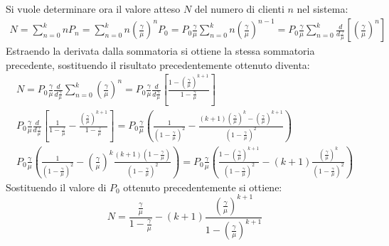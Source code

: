 \documentclass{article}
\numberwithin{equation}{subsection}
\begin{document}
Si vuole determinare ora il valore atteso $N$ del numero di clienti $n$ nel sistema:
\begin{gather*}
    N=\displaystyle\sum_{n=0}^knP_n=\sum_{n=0}^kn\left(\frac{\gamma}{\mu}\right)^nP_0=P_0\frac{\gamma}{\mu}\sum_{n=0}^kn\left(\frac{\gamma}{\mu}\right)^{n-1}=P_0\frac{\gamma}{\mu}\sum_{n=0}^k\frac{d}{d\displaystyle\frac{\gamma}{\mu}}\left[\left(\frac{\gamma}{\mu}\right)^n\right]
\end{gather*}
Estraendo la derivata dalla sommatoria si ottiene la stessa sommatoria precedente, sostituendo il risultato precedentemente ottenuto diventa: 
\begin{gather*}
    N=P_0\displaystyle\frac{\gamma}{\mu}\frac{d}{\displaystyle d\frac{\gamma}{\mu}}\sum_{n=0}^k\left(\frac{\gamma}{\mu}\right)^n=P_0\frac{\gamma}{\mu}\frac{d}{\displaystyle d\frac{\gamma}{\mu}}\left[\frac{1-\displaystyle\left(\frac{\gamma}{\mu}\right)^{k+1}}{1-\displaystyle\frac{\gamma}{\mu}}\right]\\
    \displaystyle P_0\frac{\gamma}{\mu}\frac{d}{\displaystyle d\frac{\gamma}{\mu}}\left[\frac{1}{1-\displaystyle\frac{\gamma}{\mu}}-\frac{\displaystyle\left(\frac{\gamma}{\mu}\right)^{k+1}}{1-\displaystyle\frac{\gamma}{\mu}}\right]=P_0\frac{\gamma}{\mu}\left(\frac{1}{\displaystyle\left(1-\frac{\gamma}{\mu}\right)^2}-\frac{(k+1)\displaystyle\left(\frac{\gamma}{\mu}\right)^k-\left(\frac{\gamma}{\mu}\right)^{k+1}}{\displaystyle\left(1-\frac{\gamma}{\mu}\right)^2}\right)\\
    P_0\frac{\gamma}{\mu}\left(\frac{1}{\displaystyle\left(1-\frac{\gamma}{\mu}\right)^2}-\left(\frac{\gamma}{\mu}\right)^k\frac{(k+1)\left(1-\displaystyle\frac{\gamma}{\mu}\right)}{\displaystyle\left(1-\frac{\gamma}{\mu}\right)^2}\right)=P_0\frac{\gamma}{\mu}\left(\frac{1-\displaystyle\left(\frac{\gamma}{\mu}\right)^{k+1}}{\displaystyle\left(1-\frac{\gamma}{\mu}\right)^2}-(k+1)\frac{\displaystyle\left(\frac{\gamma}{\mu}\right)^k}{\displaystyle\left(1-\frac{\gamma}{\mu}\right)^2}\right)
\end{gather*}
Sostituendo il valore di $P_0$ ottenuto precedentemente si ottiene: 
\begin{equation}
    N=\displaystyle\frac{\displaystyle\frac{\gamma}{\mu}}{1-\displaystyle\frac{\gamma}{\mu}}-(k+1)\frac{\displaystyle\left(\frac{\gamma}{\mu}\right)^{k+1}}{1-\left(\displaystyle\frac{\gamma}{\mu}\right)^{k+1}}
\end{equation}
\end{document}
